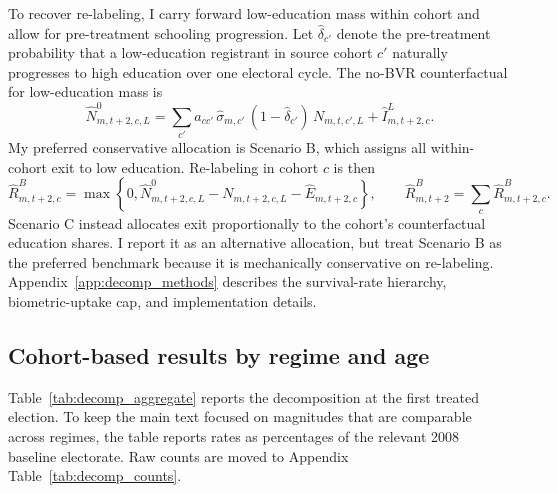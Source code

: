 To recover re-labeling, I carry forward low-education mass within cohort and allow for pre-treatment schooling progression. Let $\hat\delta_{c'}$ denote the pre-treatment probability that a low-education registrant in source cohort $c'$ naturally progresses to high education over one electoral cycle. The no-BVR counterfactual for low-education mass is
\begin{equation}
\widehat N^{0}_{m,t+2,c,L} = \sum_{c'} a_{cc'}\,\hat\sigma_{m,c'}\,(1-\hat\delta_{c'})\,N_{m,t,c',L} + \hat I^L_{m,t+2,c}.
\label{eq:low_counterfactual_main_revised}
\end{equation}
My preferred conservative allocation is Scenario B, which assigns all within-cohort exit to low education. Re-labeling in cohort $c$ is then
\begin{equation}
\widehat R^{B}_{m,t+2,c} = \max\!\left\{0,\widehat N^{0}_{m,t+2,c,L} - N_{m,t+2,c,L} - \widehat E_{m,t+2,c}\right\},
\qquad
\widehat R^{B}_{m,t+2} = \sum_c \widehat R^{B}_{m,t+2,c}.
\label{eq:relabel_main_revised}
\end{equation}
Scenario C instead allocates exit proportionally to the cohort's counterfactual education shares. I report it as an alternative allocation, but treat Scenario B as the preferred benchmark because it is mechanically conservative on re-labeling. Appendix~\ref{app:decomp_methods} describes the survival-rate hierarchy, biometric-uptake cap, and implementation details.

\subsection{Cohort-based results by regime and age}
\label{ssec:decomposition_results}

Table~\ref{tab:decomp_aggregate} reports the decomposition at the first treated election. To keep the main text focused on magnitudes that are comparable across regimes, the table reports rates as percentages of the relevant 2008 baseline electorate. Raw counts are moved to Appendix Table~\ref{tab:decomp_counts}.

